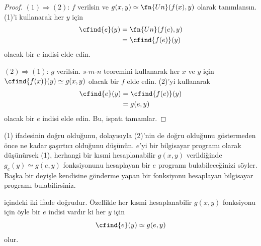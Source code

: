 \begin{proof}
$(1)\Rightarrow(2)$: $f$ verilsin ve
$g(x,y)\simeq\fn{Un}(f(x),y)$ olarak tanımlansın. (1)'i kullanarak her $y$
için
\begin{align*}
  \cfind{e}(y) & = \fn{Un}(f(e),y)\\
  & = \cfind{f(e)}(y)
\end{align*}
olacak bir $e$ indisi elde edin.

$(2)\Rightarrow(1)$: $g$ verilsin. $s$-$m$-$n$ teoremini kullanarak her
$x$ ve $y$ için $\cfind{f(x)}(y)\simeq g(x,y)$ olacak bir $f$ elde edin.
(2)'yi kullanarak
\begin{align*}
  \cfind{e}(y) & = \cfind{f(e)}(y)\\
  & = g(e,y)
\end{align*}
olacak bir $e$ indisi elde edin. Bu, ispatı tamamlar.
\end{proof}

\begin{explain}
(1) ifadesinin doğru olduğunu, dolayısıyla (2)'nin de doğru olduğunu
göstermeden önce ne kadar şaşırtıcı olduğunu düşünün. $e$'yi bir bilgisayar
programı olarak düşünürsek (1), herhangi bir kısmi hesaplanabilir $g(x,y)$
verildiğinde $g_e(y)\simeq g(e,y)$ fonksiyonunu hesaplayan bir $e$ programı
bulabileceğinizi söyler. Başka bir deyişle kendisine gönderme yapan bir
fonksiyonu hesaplayan bilgisayar programı bulabilirsiniz.
\end{explain}

\begin{thm}
 içindeki iki ifade doğrudur. Özellikle her kısmi
hesaplanabilir $g(x,y)$ fonksiyonu için öyle bir $e$ indisi vardır ki her
$y$ için
\[
  \cfind{e}(y)\simeq g(e,y)
\]
olur.
\end{thm}

